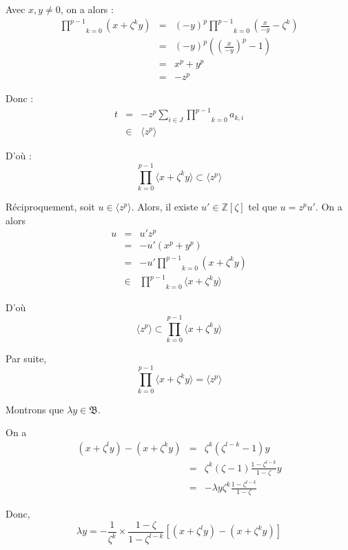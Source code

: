 Avec $x, y \neq 0$, on a alors :
\begin{eqnarray*}
  \underset{k = 0}{\overset{p - 1}{\prod}} (x + \zeta^k y) & = & (- y)^p
  \underset{k = 0}{\overset{p - 1}{\prod}} \left( \frac{x}{- y} - \zeta^k
  \right)\\
  & = & (- y)^p \left( \left( \frac{x}{- y} \right)^p - 1 \right)\\
  & = & x^p + y^p\\
  & = & - z^p
\end{eqnarray*}


Donc :
\begin{eqnarray*}
  t & = & - z^p \underset{i \in J}{\sum} \underset{k = 0}{\overset{p -
  1}{\prod}} a_{k, i}\\
  & \in & \langle z^p \rangle
\end{eqnarray*}


D'o{\`u} :
\[ \underset{k = 0}{\overset{p - 1}{\prod}} \langle x + \zeta^k y \rangle
   \subset \langle z^p \rangle \]


R{\'e}ciproquement, soit $u \in \langle z^p \rangle$. Alors, il existe $u' \in
\mathbb{Z} [\zeta]$ tel que $u = z^p u'$. On a alors
\begin{eqnarray*}
  u & = & u' z^p\\
  & = & - u' (x^p + y^p)\\
  & = & - u' \underset{k = 0}{\overset{p - 1}{\prod}} (x + \zeta^k y)\\
  & \in & \underset{k = 0}{\overset{p - 1}{\prod}} \langle x + \zeta^k y
  \rangle
\end{eqnarray*}


D'o{\`u}
\[ \langle z^p \rangle \subset \underset{k = 0}{\overset{p - 1}{\prod}}
   \langle x + \zeta^k y \rangle \]


Par suite,
\[ \underset{k = 0}{\overset{p - 1}{\prod}} \langle x + \zeta^k y \rangle =
   \langle z^p \rangle \]


 Montrons que $\lambda y \in \mathfrak{B}$.

On a
\begin{eqnarray*}
  (x + \zeta^l y) - (x + \zeta^k y) & = & \zeta^k (\zeta^{l - k} - 1) y\\
  & = & \zeta^k (\zeta - 1) \frac{1 - \zeta^{l - k}}{1 - \zeta} y\\
  & = & - \lambda y \zeta^k \frac{1 - \zeta^{l - k}}{1 - \zeta}
\end{eqnarray*}


Donc,
\[ \lambda y = - \frac{1}{\zeta^k} \times \frac{1 - \zeta}{1 - \zeta^{l - k}}
   [(x + \zeta^l y) - (x + \zeta^k y)] \]


